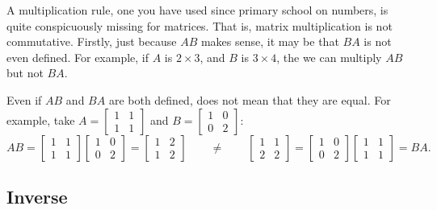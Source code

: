 A multiplication rule, one you have used since primary school on numbers,
is quite conspicuously missing for matrices.
That is, matrix multiplication is
not commutative.  Firstly, just because $AB$ makes sense, it may be
that $BA$ is not even defined.  For example, if $A$ is $2 \times 3$, and
$B$ is $3 \times 4$, the we can multiply $AB$ but not $BA$.

Even if $AB$ and $BA$ are both defined, does not mean that they are equal.
For example, take
$A = \left[ \begin{smallmatrix} 1 & 1 \\ 1 & 1 \end{smallmatrix} \right]$
and
$B = \left[ \begin{smallmatrix} 1 & 0 \\ 0 & 2 \end{smallmatrix} \right]$:
\begin{equation*}
AB = 
\begin{bmatrix} 1 & 1 \\ 1 & 1 \end{bmatrix}
\begin{bmatrix} 1 & 0 \\ 0 & 2 \end{bmatrix}
=
\begin{bmatrix} 1 & 2 \\ 1 & 2 \end{bmatrix}
\qquad
\not=
\qquad
\begin{bmatrix} 1 & 1 \\ 2 & 2 \end{bmatrix}
=
\begin{bmatrix} 1 & 0 \\ 0 & 2 \end{bmatrix}
\begin{bmatrix} 1 & 1 \\ 1 & 1 \end{bmatrix}
=
BA .
\end{equation*}

\subsection{Inverse}

